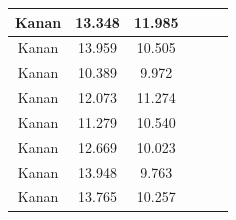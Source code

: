 \begin{longtable}{|c|c|c|c|c|c|}
  Kanan          & 13.348              & 11.985           \\ \hline
  Kanan          & 13.959              & 10.505           \\ \hline
  Kanan          & 10.389              & 9.972            \\ \hline
  Kanan          & 12.073              & 11.274           \\ \hline
  Kanan          & 11.279              & 10.540           \\ \hline
  Kanan          & 12.669              & 10.023           \\ \hline
  Kanan          & 13.948              & 9.763            \\ \hline
  Kanan          & 13.765              & 10.257           \\ \hline
\end{longtable}

